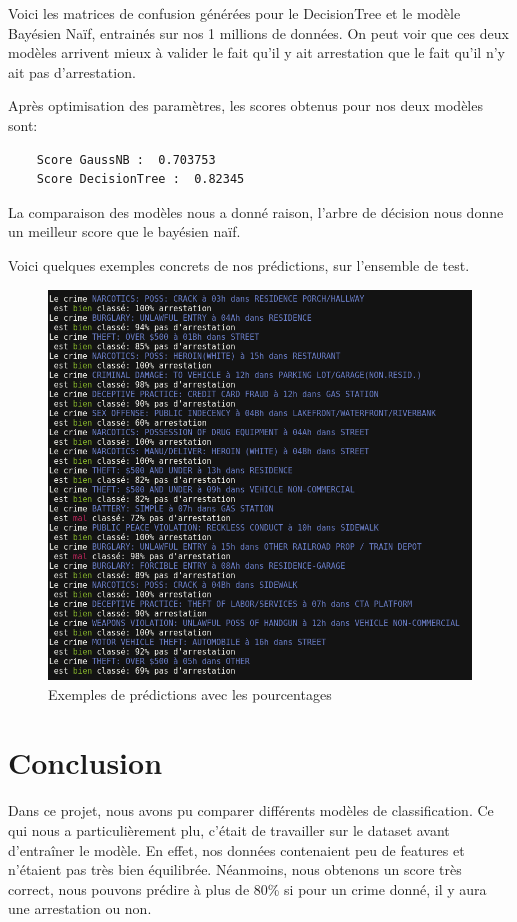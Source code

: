 \documentclass{article}
\begin{document}
    Voici les matrices de confusion générées pour le DecisionTree et le modèle 
    Bayésien Naïf, entrainés sur nos 1 millions de données. 
    On peut voir que ces deux modèles arrivent 
    mieux à valider le fait qu'il y ait arrestation que le fait qu'il n'y ait 
    pas d'arrestation.

    Après optimisation des paramètres, les scores obtenus pour nos deux modèles sont:
    \begin{Verbatim}
    Score GaussNB :  0.703753
    Score DecisionTree :  0.82345
    \end{Verbatim}

    La comparaison des modèles nous a donné raison, l'arbre de décision nous donne
    un meilleur score que le bayésien naïf.

    Voici quelques exemples concrets de nos prédictions, sur l'ensemble de test.
    \begin{figure}[H]
	    \centering
	    \includegraphics[scale=.4]{images/results.png}
	    \caption{Exemples de prédictions avec les pourcentages}
    \end{figure}


    \section{Conclusion}
    Dans ce projet, nous avons pu comparer différents modèles de
    classification. 
    Ce qui nous a particulièrement plu, c'était de travailler sur le dataset
    avant d'entraîner le modèle. En effet, nos données contenaient peu de
    features et n'étaient pas très bien équilibrée.
    Néanmoins, nous obtenons un score très correct, nous pouvons prédire à
    plus de 80\% si pour un crime donné, il y aura une arrestation ou non.
\end{document}
